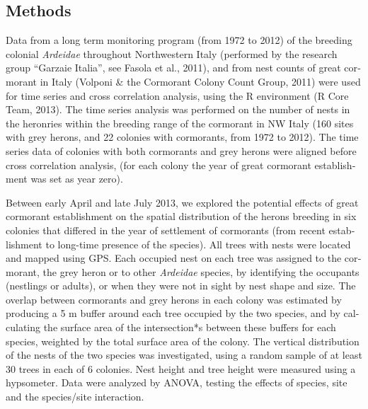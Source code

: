\begin{otherlanguage}{english}
\section*{Methods}
Data from a long term monitoring program (from 1972 to 2012) of the
breeding colonial \textit{Ardeidae} throughout Northwestern Italy
(performed by the research group {\textquotedblleft}Garzaie
Italia{\textquotedblright}, see Fasola et al., 2011), and from nest
counts of great cormorant in Italy (Volponi \& the Cormorant Colony
Count Group, 2011) were used for time series and cross correlation
analysis, using the R environment (R Core Team, 2013). The time series
analysis was performed on the number of nests in the heronries within
the breeding range of the cormorant in NW Italy (160 sites with grey
herons, and 22 colonies with cormorants, from 1972 to 2012). The time
series data of colonies with both cormorants and grey herons were
aligned before cross correlation analysis, (for each colony the year of
great cormorant establishment was set as year zero).

Between early April and late July 2013, we explored the potential
effects of great cormorant establishment on the spatial distribution of
the herons breeding in six colonies that differed in the year of
settlement of cormorants (from recent establishment to long-time
presence of the species). All trees with nests were located and mapped
using GPS. Each occupied nest on each tree was assigned to the
cormorant, the grey heron or to other \textit{Ardeidae} species, by
identifying the occupants (nestlings or adults), or when they were not
in sight by nest shape and size. The overlap between cormorants and
grey herons in each colony was estimated by producing a 5 m buffer
around each tree occupied by the two species, and by calculating the
surface area of the intersection*s between these buffers for each
species, weighted by the total surface area of the colony. The vertical
distribution of the nests of the two species was investigated, using a
random sample of at least 30 trees in each of 6 colonies. Nest height
and tree height were measured using a hypsometer. Data were analyzed by
ANOVA, testing the effects of species, site and the species/site
interaction.


\end{otherlanguage}
